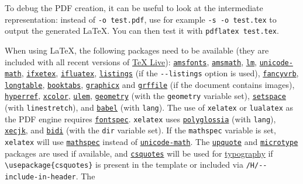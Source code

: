\documentclass[
  12pt,
  a4paper,
]{article}
\begin{document}
To debug the PDF creation, it can be useful to look at the intermediate representation: instead of
\texttt{-o\ test.pdf}, use for example \texttt{-s\ -o\ test.tex} to output the generated LaTeX.
You can then test it with \texttt{pdflatex\ test.tex}.

When using LaTeX, the following packages need to be available (they are included with all recent
versions of \href{http://www.tug.org/texlive/}{TeX Live}):
\href{https://ctan.org/pkg/amsfonts}{\texttt{amsfonts}},
\href{https://ctan.org/pkg/amsmath}{\texttt{amsmath}},
\href{https://ctan.org/pkg/lm}{\texttt{lm}},
\href{https://ctan.org/pkg/unicode-math}{\texttt{unicode-math}},
\href{https://ctan.org/pkg/ifxetex}{\texttt{ifxetex}},
\href{https://ctan.org/pkg/ifluatex}{\texttt{ifluatex}},
\href{https://ctan.org/pkg/listings}{\texttt{listings}} (if the \texttt{-\/-listings} option is
used), \href{https://ctan.org/pkg/fancyvrb}{\texttt{fancyvrb}},
\href{https://ctan.org/pkg/longtable}{\texttt{longtable}},
\href{https://ctan.org/pkg/booktabs}{\texttt{booktabs}},
\href{https://ctan.org/pkg/graphicx}{\texttt{graphicx}} and
\href{https://ctan.org/pkg/grffile}{\texttt{grffile}} (if the document contains images),
\href{https://ctan.org/pkg/hyperref}{\texttt{hyperref}},
\href{https://ctan.org/pkg/xcolor}{\texttt{xcolor}},
\href{https://ctan.org/pkg/ulem}{\texttt{ulem}},
\href{https://ctan.org/pkg/geometry}{\texttt{geometry}} (with the \texttt{geometry} variable set),
\href{https://ctan.org/pkg/setspace}{\texttt{setspace}} (with \texttt{linestretch}), and
\href{https://ctan.org/pkg/babel}{\texttt{babel}} (with \texttt{lang}). The use of
\texttt{xelatex} or \texttt{lualatex} as the PDF engine requires
\href{https://ctan.org/pkg/fontspec}{\texttt{fontspec}}. \texttt{xelatex} uses
\href{https://ctan.org/pkg/polyglossia}{\texttt{polyglossia}} (with \texttt{lang}),
\href{https://ctan.org/pkg/xecjk}{\texttt{xecjk}}, and
\href{https://ctan.org/pkg/bidi}{\texttt{bidi}} (with the \texttt{dir} variable set). If the
\texttt{mathspec} variable is set, \texttt{xelatex} will use
\href{https://ctan.org/pkg/mathspec}{\texttt{mathspec}} instead of
\href{https://ctan.org/pkg/unicode-math}{\texttt{unicode-math}}. The
\href{https://ctan.org/pkg/upquote}{\texttt{upquote}} and
\href{https://ctan.org/pkg/microtype}{\texttt{microtype}} packages are used if available, and
\href{https://ctan.org/pkg/csquotes}{\texttt{csquotes}} will be used for
\protect\hyperlink{typography}{typography} if \texttt{\textbackslash{}usepackage\{csquotes\}} is
present in the template or included via \texttt{/H/-\/-include-in-header}. The
\end{document}
